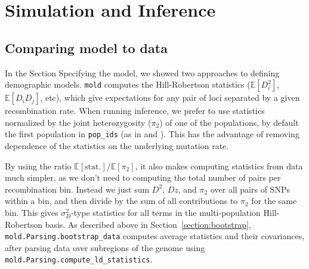 \documentclass[10pt]{article}
\makeatletter
\renewcommand{\cite}{\citep}
\newcommand{\mold}{\texttt{mold}\xspace}
\newcommand{\py}[1]{\lstinline[breaklines=true,language=Python, showstringspaces=False]@#1@}
\newcommand{\E}{\mathbb{E}}
\makeatother
\begin{document}
%    
%    

\clearpage

\section{Simulation and Inference}


\subsection{Comparing model to data}

In the Section Specifying the model, we showed two approaches to defining demographic models.
\mold computes the Hill-Robertson statistics ($\E[D_i^2]$, $\E[D_i D_j]$, etc), which give expectations for any pair of loci separated by a given recombination rate.
When running inference, we prefer to use statistics normalized by the joint heterozygosity ($\pi_2$) of one of the populations, by default the first population in \py{pop_ids} (as in \cite{Rogers2014} and \cite{Ragsdale2018}).
This has the advantage of removing dependence of the statistics on the underlying mutation rate.

By using the ratio $\E[\text{stat.}]/\E[\pi_2]$, it also makes computing statistics from data much simpler, as we don't need to computing the total number of pairs per recombination bin.
Instead we just sum $D^2$, $Dz$, and $\pi_2$ over all pairs of SNPs within a bin, and then divide by the sum of all contributions to $\pi_2$ for the same bin.
This gives $\sigma_D^2$-type statistics for all terms in the multi-population Hill-Robertson basis.
As described above in Section~\ref{section:bootstrap}, \py{mold.Parsing.bootstrap_data} computes average statistics and their covariances, after parsing data over subregions of the genome using \py{mold.Parsing.compute_ld_statistics}.
\end{document}
